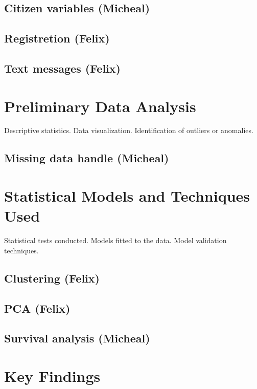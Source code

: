 \documentclass[12pt]{article}
\begin{document}
\subsection{Citizen variables (Micheal)}

\subsection{Registretion (Felix)}

\subsection{Text messages (Felix)}

\section{Preliminary Data Analysis}

Descriptive statistics.
Data visualization.
Identification of outliers or anomalies.

\subsection{Missing data handle (Micheal)}

\section{Statistical Models and Techniques Used}

Statistical tests conducted.
Models fitted to the data.
Model validation techniques.

\subsection{Clustering (Felix)}

\subsection{PCA (Felix) }

\subsection{Survival analysis (Micheal)}

\section{Key Findings}
\end{document}

